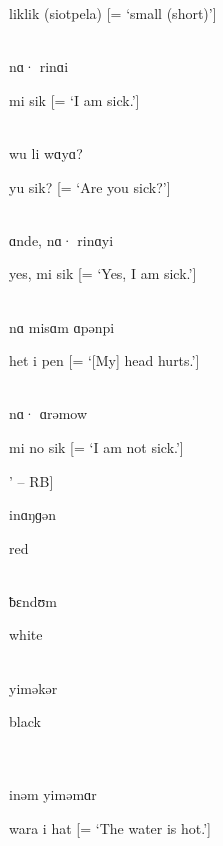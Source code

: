 \noindent liklik (siotpela) [= ‘small (short)’]

\\

\noindent nɑ· rinɑi

\noindent mi sik [= ‘I am sick.’]

\noindent [‘I am sick.’ (?) -- RB]\\

\noindent wu li wɑyɑ?

\noindent yu sik? [= ‘Are you sick?’]

\\

\noindent ɑnde, nɑ· rinɑyi

\noindent yes, mi sik [= ‘Yes, I am sick.’]

\\

\noindent nɑ misɑm ɑpənpi

\noindent het i pen [= ‘[My] head hurts.’]

\\

\noindent nɑ· ɑrəmow

\noindent mi no sik [= ‘I am not sick.’]

\noindent [‘I am good [= healthy]’ -- RB]\\

\newpage

\noindent inɑŋɡən

\noindent red

\noindent [‘red’ -- RB]\\

\noindent ƀɛndʊm

\noindent white

\noindent [‘white’ -- RB]\\

\noindent yiməkər

\noindent black

\noindent [‘black’ -- RB]\\

\\

\noindent inəm yiməmɑr

\noindent wara i hat [= ‘The water is hot.’]

\\

